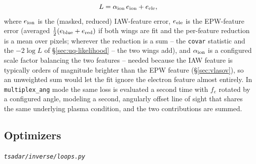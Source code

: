 \documentclass[11pt]{article}
\newcommand{\code}[1]{\texttt{#1}}
\newcommand{\file}[1]{\texttt{#1}}
\begin{document}
\begin{equation}
  L = \alpha_{\rm ion}\,e_{\rm ion}+e_{\rm ele},
\end{equation}
where $e_{\rm ion}$ is the (masked, reduced) IAW-feature error, $e_{\rm ele}$ is the
EPW-feature error (averaged $\tfrac12(e_{\rm blue}+e_{\rm red})$ if both wings are fit
and the per-feature reduction is a mean over pixels; wherever the reduction is a sum --
the \code{covar} statistic and the $-2\log L$ of \S\ref{sec:uq-likelihood} -- the two
wings add),
and $\alpha_{\rm ion}$ is a configured scale factor balancing the two features -- needed
because the IAW feature is typically orders of magnitude brighter than the EPW feature
(\S\ref{sec:vlasov}), so an unweighted sum would let the fit ignore the electron feature
almost entirely. In \code{multiplex\_ang} mode the same loss is evaluated a second time
with $f_e$ rotated by a configured angle, modeling a second, angularly offset line of sight
that shares the same underlying plasma condition, and the two contributions are summed.

\subsection{Optimizers}\label{sec:optimizers}
\textit{\file{tsadar/inverse/loops.py}}
\end{document}
